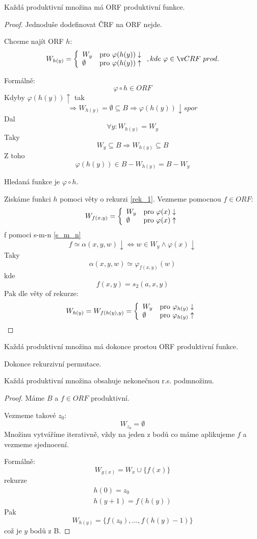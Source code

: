 \begin{theorem}
	Každá produktivní množina má ORF produktivní funkce.
\end{theorem}
\begin{proof}
	Jednoduše dodefinovat ČRF na ORF nejde.

	Chceme najít ORF $h$:
	\[ W_{h(y)} = \twopartdef { W_y } { \varphi(h(y)) \downarrow } { \emptyset } { \varphi(h(y)) \uparrow }, kde\ \varphi \in ČRF\ prod. \]

	Formálně:
	\[ \varphi \circ h \in ORF \]
	Kdyby $\varphi(h(y)) \uparrow$ tak
	\[ \Rightarrow W_{h(y)} = \emptyset \subseteq B \Rightarrow \varphi(h(y)) \downarrow spor \]
	Dal
	\[ \forall y: W_{h(y)} = W_y \]
	Taky
	\[ W_y \subseteq B \Rightarrow W_{h(y)} \subseteq B \]
	Z toho
	\[ \varphi(h(y)) \in B - W_{h(y)} = B - W_y \]

	Hledaná funkce je $\varphi \circ h$.

	Ziskáme funkci $h$ pomoci věty o rekurzi \cref{rek_1}.
	Vezmeme pomocnou $f \in ORF$:
	\[ W_{f(x, y)} = \left\{ \begin{array}{ll}  W_y  & \mbox{pro }  \varphi(x) \downarrow  \\  \emptyset  & \mbox{pro }  \varphi(x) \uparrow  \end{array} \right. \]
	f pomoci s-m-n \cref{s_m_n}
	\[ f \simeq \alpha(x, y, w) \downarrow \iff w \in W_y \land \varphi(x) \downarrow \]
	Taky
	\[ \alpha(x, y, w) \simeq \varphi_{f(x, y)} (w) \]
	kde
	\[ f(x, y) = s_2(a, x, y) \]
	Pak dle věty of rekurze:
	\[ W_{h(y)} = W_{f(h(y), y)} = \left\{ \begin{array}{ll}  W_y  & \mbox{pro }  \varphi_{h(y)} \downarrow  \\  \emptyset  & \mbox{pro }  \varphi_{h(y)} \uparrow  \end{array} \right. \]

\end{proof}

\begin{theorem}
	Každá produktivní množina má dokonce prostou ORF produktivní funkce.

	Dokonce rekurzivní permutace.
\end{theorem}

\begin{theorem}\label{product_inf}
	Každá produktivní množina obsahuje nekonečnou r.s. podmnožinu.
\end{theorem}
\begin{proof}
	Máme $B$ a $f \in ORF$ produktivní.

	Vezmeme takové $z_0$:
	\[ W_{z_0} = \emptyset \]
	Množinu vytváříme iterativně, vždy na jeden z bodů co máme aplikujeme $f$ a vezmeme sjednocení.

	Formálně:
	\[ W_{g(x)} = W_x \cup \{ f(x) \} \]
	rekurze
	\begin{align}
		h(0) = z_0\\
		h(y + 1) = f(h(y))
	\end{align}
	Pak
	\[ W_{h(y)} = \{ f(z_0), \ldots, f(h(y) - 1) \} \]
	což je $y$ bodů z B.
\end{proof}

